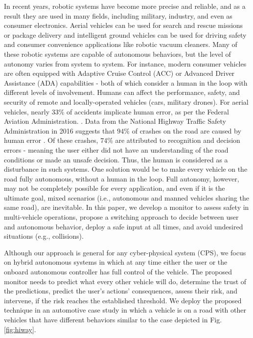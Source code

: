 \documentclass[letterpaper, 10 pt, conference]{ieeeconf}  %
\begin{document}
 In recent years, robotic systems have become more precise and reliable, and as a result they are used in many fields, including military, industry, and even as consumer electronics. Aerial vehicles can be used for search and rescue missions or package delivery and intelligent ground vehicles can be used for driving safety and consumer convenience applications like robotic vacuum cleaners. Many of these robotic systems are capable of autonomous behaviors, but the level of autonomy varies from system to system. For instance, modern consumer vehicles are often equipped with Adaptive Cruise Control (ACC)\cite{acc} or Advanced Driver Assistance (ADA)\cite{adas} capabilities - both of which consider a human in the loop with different levels of involvement. Humans can affect the performance, safety, and security of remote and locally-operated vehicles (cars, military drones). For aerial vehicles, nearly $33$\% of accidents implicate human error, as per the Federal Aviation Administration. \cite{aviacc}. Data from the National Highway Traffic Safety Administration in 2016 suggests that $94\%$ of crashes on the road are caused by human error \cite{nhtsa}. Of these crashes, $74\%$ are attributed to recognition and decision errors - meaning the user either did not have an understanding of the road conditions or made an unsafe decision. Thus, the human is considered as a disturbance in such systems. One solution would be to make every vehicle on the road fully autonomous, without a human in the loop. Full autonomy, however, may not
be completely possible for every application, and even if it is the ultimate goal, mixed scenarios (i.e., autonomous and manned vehicles sharing the same road), are inevitable. In this paper, we develop a monitor to assess safety in multi-vehicle operations, propose a switching approach to decide between user and autonomous behavior, deploy a safe input at all times, and avoid undesired situations (e.g., collisions).

Although our approach is general for any cyber-physical system (CPS), we focus on hybrid autonomous systems in which at any time either the user or the onboard autonomous controller has full control of the vehicle. The proposed monitor needs to predict what every other vehicle will do, determine the trust of the predictions, predict the user's actions' consequences, assess their risk, and intervene, if the risk reaches the established threshold. We deploy the proposed technique in an automotive case study in which a vehicle is on a road with other vehicles that have different behaviors similar to the case depicted in Fig.\ref{fig:hiway}.
\end{document}
